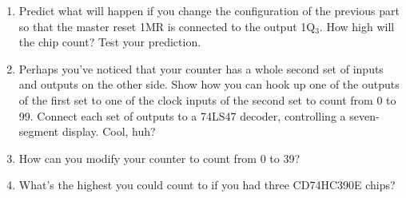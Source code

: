 \begin{enumerate}
\item Predict what will happen if you change the configuration of the previous part so that the master reset 1MR is connected to the output 1Q$_3$.  How high will the chip count?  Test your prediction.

\pagebreak[2]
\item Perhaps you've noticed that your counter has a whole second set of inputs and outputs on the other side.  Show how you can hook up one of the outputs of the first set to one of the clock inputs of the second set to count from 0 to 99.  Connect each set of outputs to a 74LS47 decoder, controlling a seven-segment display.  Cool, huh?

\item How can you modify your counter to count from 0 to 39?  

\item What's the highest you could count to if you had three CD74HC390E chips?


\end{enumerate}
